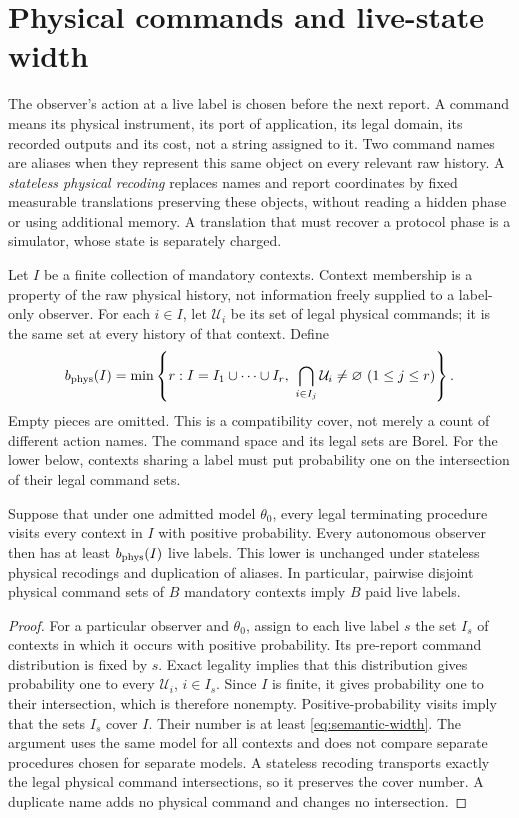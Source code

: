 \section{Physical commands and live-state width}
\label{sec:memory}
The observer's action at a live label is chosen before the next report. A command means its physical instrument, its port of application, its legal domain, its recorded outputs and its cost, not a string assigned to it. Two command names are aliases when they represent this same object on every relevant raw history. A \emph{stateless physical recoding} replaces names and report coordinates by fixed measurable translations preserving these objects, without reading a hidden phase or using additional memory. A translation that must recover a protocol phase is a simulator, whose state is separately charged.

Let $I$ be a finite collection of mandatory contexts. Context membership is a property of the raw physical history, not information freely supplied to a label-only observer. For each $i\in I$, let $\mathcal U_i$ be its set of legal physical commands; it is the same set at every history of that context. Define
\begin{equation}\label{eq:semantic-width}
 b_{\rm phys}(I)=\min\left\{r:I=I_1\cup\cdots\cup I_r,
       \ \bigcap_{i\in I_j}\mathcal U_i\ne\varnothing\ (1\le j\le r)\right\}.
\end{equation}
Empty pieces are omitted. This is a compatibility cover, not merely a count of different action names. The command space and its legal sets are Borel. For the lower below, contexts sharing a label must put probability one on the intersection of their legal command sets.

\begin{proposition}\label{prop:semantic}
Suppose that under one admitted model $\theta_0$, every legal terminating procedure visits every context in $I$ with positive probability. Every autonomous observer then has at least $b_{\rm phys}(I)$ live labels. This lower is unchanged under stateless physical recodings and duplication of aliases. In particular, pairwise disjoint physical command sets of $B$ mandatory contexts imply $B$ paid live labels.
\end{proposition}
\begin{proof}
For a particular observer and $\theta_0$, assign to each live label $s$ the set $I_s$ of contexts in which it occurs with positive probability. Its pre-report command distribution is fixed by $s$. Exact legality implies that this distribution gives probability one to every $\mathcal U_i$, $i\in I_s$. Since $I$ is finite, it gives probability one to their intersection, which is therefore nonempty. Positive-probability visits imply that the sets $I_s$ cover $I$. Their number is at least \eqref{eq:semantic-width}. The argument uses the same model for all contexts and does not compare separate procedures chosen for separate models. A stateless recoding transports exactly the legal physical command intersections, so it preserves the cover number. A duplicate name adds no physical command and changes no intersection.
\end{proof}

